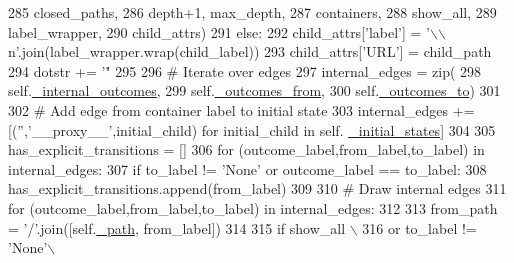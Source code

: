 \begin{DoxyCode}
{{{{285                             closed\_paths,
286                             depth+1, max\_depth,
287                             containers,
288                             show\_all,
289                             label\_wrapper,
290                             child\_attrs)
291                 \textcolor{keywordflow}{else}:
292                     child\_attrs[\textcolor{stringliteral}{'label'}] = \textcolor{stringliteral}{'\(\backslash\)\(\backslash\)n'}.join(label\_wrapper.wrap(child\_label))
293                     child\_attrs[\textcolor{stringliteral}{'URL'}] = child\_path
294                     dotstr += \textcolor{stringliteral}{'"%
295 
296             \textcolor{comment}{# Iterate over edges}
297             internal\_edges = zip(
298                     self.\hyperlink{classsmacc__viewer_1_1ContainerNode_a0cecef41d6d1036c4716d1143479743a}{\_internal\_outcomes},
299                     self.\hyperlink{classsmacc__viewer_1_1ContainerNode_ad0975f45567a6339b66516548e67385a}{\_outcomes\_from},
300                     self.\hyperlink{classsmacc__viewer_1_1ContainerNode_a26f35e2c039a0a7d5f68a5abfc918627}{\_outcomes\_to})
301 
302             \textcolor{comment}{# Add edge from container label to initial state}
303             internal\_edges += [(\textcolor{stringliteral}{''},\textcolor{stringliteral}{'\_\_proxy\_\_'},initial\_child) \textcolor{keywordflow}{for} initial\_child \textcolor{keywordflow}{in} self.
      \hyperlink{classsmacc__viewer_1_1ContainerNode_a3d5c9521ab4377e7b94e437d4f7e5a83}{\_initial\_states}]
304 
305             has\_explicit\_transitions = []
306             \textcolor{keywordflow}{for} (outcome\_label,from\_label,to\_label) \textcolor{keywordflow}{in} internal\_edges:
307                 \textcolor{keywordflow}{if} to\_label != \textcolor{stringliteral}{'None'} \textcolor{keywordflow}{or} outcome\_label == to\_label:
308                     has\_explicit\_transitions.append(from\_label)
309 
310             \textcolor{comment}{# Draw internal edges}
311             \textcolor{keywordflow}{for} (outcome\_label,from\_label,to\_label) \textcolor{keywordflow}{in} internal\_edges:
312 
313                 from\_path = \textcolor{stringliteral}{'/'}.join([self.\hyperlink{classsmacc__viewer_1_1ContainerNode_ae600e450e4ccfa137937076c391ded72}{\_path}, from\_label])
314 
315                 \textcolor{keywordflow}{if} show\_all \(\backslash\)
316                         \textcolor{keywordflow}{or} to\_label != \textcolor{stringliteral}{'None'}\(\backslash\)
}}}}}
\end{DoxyCode}
